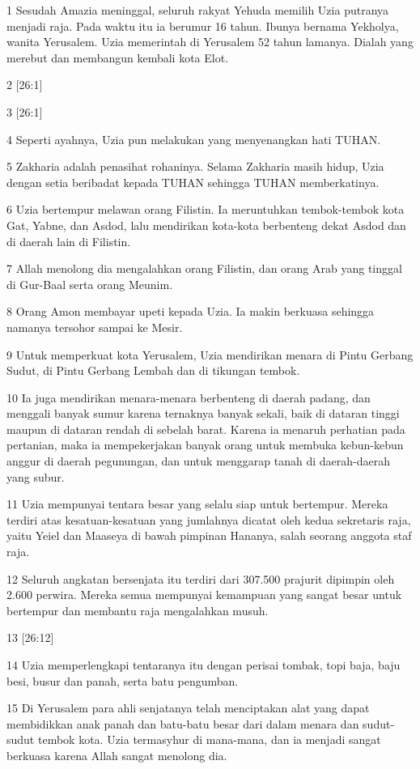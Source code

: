 \par 1 Sesudah Amazia meninggal, seluruh rakyat Yehuda memilih Uzia putranya menjadi raja. Pada waktu itu ia berumur 16 tahun. Ibunya bernama Yekholya, wanita Yerusalem. Uzia memerintah di Yerusalem 52 tahun lamanya. Dialah yang merebut dan membangun kembali kota Elot.
\par 2 [26:1]
\par 3 [26:1]
\par 4 Seperti ayahnya, Uzia pun melakukan yang menyenangkan hati TUHAN.
\par 5 Zakharia adalah penasihat rohaninya. Selama Zakharia masih hidup, Uzia dengan setia beribadat kepada TUHAN sehingga TUHAN memberkatinya.
\par 6 Uzia bertempur melawan orang Filistin. Ia meruntuhkan tembok-tembok kota Gat, Yabne, dan Asdod, lalu mendirikan kota-kota berbenteng dekat Asdod dan di daerah lain di Filistin.
\par 7 Allah menolong dia mengalahkan orang Filistin, dan orang Arab yang tinggal di Gur-Baal serta orang Meunim.
\par 8 Orang Amon membayar upeti kepada Uzia. Ia makin berkuasa sehingga namanya tersohor sampai ke Mesir.
\par 9 Untuk memperkuat kota Yerusalem, Uzia mendirikan menara di Pintu Gerbang Sudut, di Pintu Gerbang Lembah dan di tikungan tembok.
\par 10 Ia juga mendirikan menara-menara berbenteng di daerah padang, dan menggali banyak sumur karena ternaknya banyak sekali, baik di dataran tinggi maupun di dataran rendah di sebelah barat. Karena ia menaruh perhatian pada pertanian, maka ia mempekerjakan banyak orang untuk membuka kebun-kebun anggur di daerah pegunungan, dan untuk menggarap tanah di daerah-daerah yang subur.
\par 11 Uzia mempunyai tentara besar yang selalu siap untuk bertempur. Mereka terdiri atas kesatuan-kesatuan yang jumlahnya dicatat oleh kedua sekretaris raja, yaitu Yeiel dan Maaseya di bawah pimpinan Hananya, salah seorang anggota staf raja.
\par 12 Seluruh angkatan bersenjata itu terdiri dari 307.500 prajurit dipimpin oleh 2.600 perwira. Mereka semua mempunyai kemampuan yang sangat besar untuk bertempur dan membantu raja mengalahkan musuh.
\par 13 [26:12]
\par 14 Uzia memperlengkapi tentaranya itu dengan perisai tombak, topi baja, baju besi, busur dan panah, serta batu pengumban.
\par 15 Di Yerusalem para ahli senjatanya telah menciptakan alat yang dapat membidikkan anak panah dan batu-batu besar dari dalam menara dan sudut-sudut tembok kota. Uzia termasyhur di mana-mana, dan ia menjadi sangat berkuasa karena Allah sangat menolong dia.

